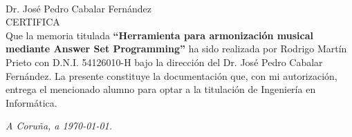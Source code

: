 \thispagestyle{empty}
\mbox{}\\[4cm]
\noindent Dr. José Pedro Cabalar Fernández \\[1cm]
\textsc{CERTIFICA}\\[1.5cm]
\indent Que la memoria titulada \textbf{``Herramienta para armonización musical mediante Answer Set Programming''}
ha sido realizada por Rodrigo Martín Prieto con D.N.I. 54126010-H bajo la
dirección del Dr. José Pedro Cabalar Fernández. La presente constituye la
documentación que, con mi autorización, entrega el mencionado
alumno para optar a la titulación de Ingeniería en Informática.
\vfill
\begin{flushright}
\emph{A Coruña, a \today{}.} \\[2cm]
\end{flushright}